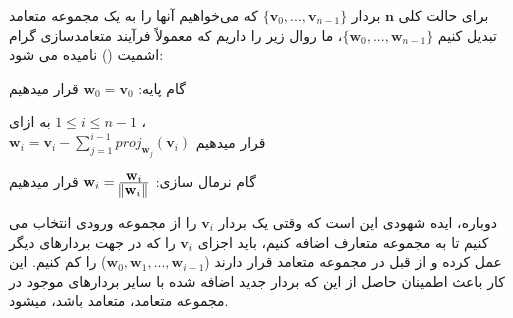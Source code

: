 {\begin{spacing}{1.5}
        برای حالت کلی $\textbf{n}$ بردار $\{\textbf{v}_{0},...,\textbf{v}_{n-1}\}$ که می‌خواهیم آنها را به یک مجموعه متعامد تبدیل کنیم $\{\textbf{w}_{0},...,\textbf{w}_{n-1}\}$، ما روال زیر را داریم که معمولاً فرآیند متعامدسازی گرام اشمیت () نامیده می شود:

        \begin{center}
            گام پایه: $\textbf{w}_{0}=\textbf{v}_{0}$ قرار میدهیم

            به ازای $1\leq i\leq n-1$ ، \\ $\textbf{w}_{i}=\textbf{v}_{i}-\sum_{j=1}^{i-1}proj_{\textbf{w}_{j}}(\textbf{v}_{i})$ قرار میدهیم

            گام نرمال سازی: $\textbf{w}_{i}=\frac{\displaystyle\textbf{w}_{i}}{\displaystyle\norm{\textbf{w}_{i}}}$ قرار میدهیم
        \end{center}

        دوباره، ایده شهودی این است که وقتی یک بردار $\textbf{v}_{i}$ را از مجموعه ورودی انتخاب می کنیم تا به مجموعه متعارف اضافه کنیم،
        باید اجزای $\textbf{v}_{i}$ را که در جهت بردارهای دیگر عمل کرده و از قبل در مجموعه متعامد قرار دارند ($\textbf{w}_{0},\textbf{w}_{1},...,\textbf{w}_{i-1}$) را کم کنیم.
        این کار باعث اطمینان حاصل از این که بردار جدید اضافه شده با سایر بردارهای موجود در مجموعه متعامد، متعامد باشد، میشود.
    \end{spacing}
}


